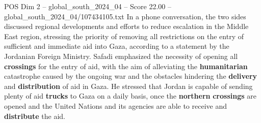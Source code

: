\begin{textsample}{POS Dim 2 – global\_south\_2024\_04 – Score 22.00 – global\_south\_2024\_04/107434105.txt}
In a phone conversation, the two sides discussed regional developments and efforts to reduce escalation in the Middle East region, stressing the priority of removing all restrictions on the entry of sufficient and immediate aid into Gaza, according to a statement by the Jordanian Foreign Ministry.
Safadi emphasized the necessity of opening all \textbf{crossings} for the entry of aid, with the aim of alleviating the \textbf{humanitarian} catastrophe caused by the ongoing war and the obstacles hindering the \textbf{delivery} and \textbf{distribution} of aid in Gaza.
He stressed that Jordan is capable of sending plenty of aid \textbf{trucks} to Gaza on a daily basis, once the \textbf{northern} \textbf{crossings} are opened and the United Nations and its agencies are able to receive and \textbf{distribute} the aid.

\end{textsample}
